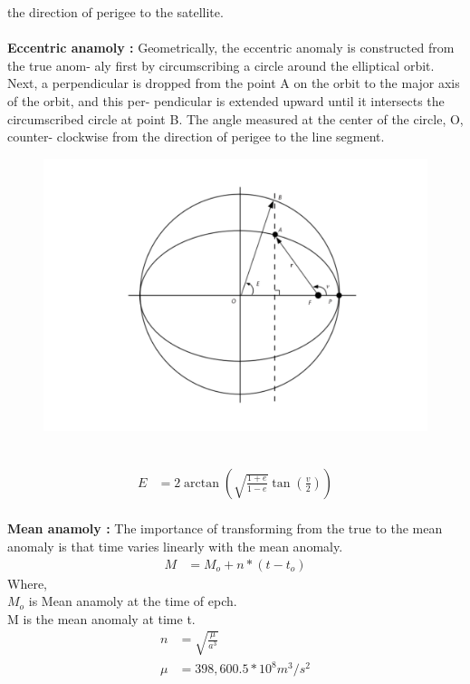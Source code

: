 \documentclass[journal,15pt,twocolumn]{IEEEtran}
\begin{document}
the direction of perigee to the satellite.\\ 
\\
\textbf{Eccentric anamoly :} Geometrically, the eccentric anomaly is constructed from the true anom-
aly first by circumscribing a circle around the elliptical orbit. Next, a perpendicular
is dropped from the point A on the orbit to the major axis of the orbit, and this per-
pendicular is extended upward until it intersects the circumscribed circle at point B. The angle measured at the center of the circle, O, counter-
clockwise from the direction of perigee to the line segment.
\begin{figure}
  \includegraphics[scale=0.4]{./figs/2.pdf}
  \end{figure}
 \vspace{30cm} \\
 \begin{align}
E&=2\arctan (\sqrt{\frac{1+e}{1-e}}\tan(\frac{v}{2})  )
 \end{align}
 \\
 \textbf{Mean anamoly :} The importance of transforming from the true to the mean
 anomaly is that time varies linearly with the mean anomaly.\\
 \begin{align}
  M&=M_o+n*(t-t_o)
 \end{align}
 Where,\\
 $M_o$ is Mean anamoly at the time of epch.\\
 M is the mean anomaly at time t.\\
 \begin{align}
  n&=\sqrt{\frac{\mu }{a^3}} \\
  \mu&=398,600.5 * 10^8 m^3/s^2
 \end{align} 
\end{document}
